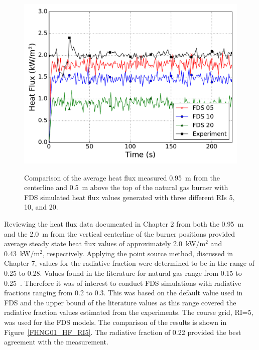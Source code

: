 \documentclass[twoside]{uocthesis}
\begin{document}
{\begin{figure}
	\includegraphics[width=5in]{../Figures/FHNG01_HF_RI} \\
	\caption[Comparison of the average heat flux measured 0.95~m from the centerline and 0.5~m above the top of the natural gas burner with FDS simulated heat flux values.]{Comparison of the average heat flux measured 0.95~m from the centerline and 0.5~m above the top of the natural gas burner with FDS simulated heat flux values generated with three different RIs 5, 10, and 20.}
	\label{FHNG01_HF_RI}
\end{figure}

Reviewing the heat flux data documented in Chapter 2 from both the 0.95~m  and the 2.0~m from the vertical centerline of the burner positions provided average steady state heat flux values of approximately 2.0~kW/m$^2$ and 0.43~kW/m$^2$, respectively.  Applying the point source method, discussed in Chapter 7, values for the radiative fraction were determined to be in the range of 0.25 to 0.28.  Values found in the literature for natural gas range from 0.15 to 0.25~\cite{Modak:1977,Hostikka:3}.   
Therefore it was of interest to conduct FDS simulations with radiative fractions ranging from 0.2 to 0.3.  This was based on the default value used in FDS and the upper bound of the literature values as this range covered the radiative fraction values estimated from the experiments.  The course grid, RI=5, was used for the FDS models.  The comparison of the results is shown in Figure~\ref{FHNG01_HF_RI5}.  The radiative fraction of 0.22 provided the best agreement with the measurement.  

}
\end{document}
